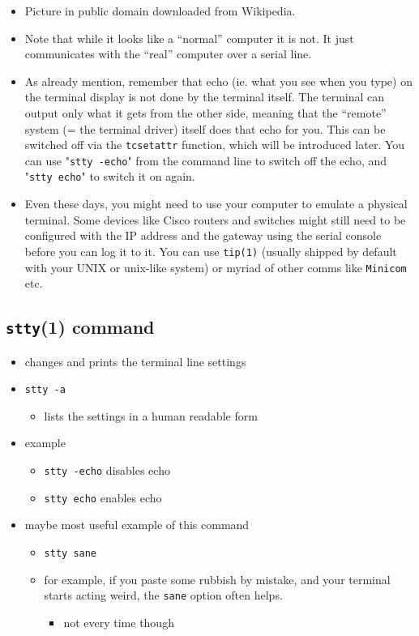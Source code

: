 \begin{itemize}
\item Picture in public domain downloaded from Wikipedia.
\item Note that while it looks like a ``normal'' computer it is not. It just
communicates with the ``real'' computer over a serial line.
\item As already mention, remember that echo (ie. what you see when you type) on
the terminal display is not done by the terminal itself. The terminal can output
only what it gets from the other side, meaning that the ``remote'' system (= the
terminal driver) itself does that echo for you. This can be switched off via the
\texttt{tcsetattr} function, which will be introduced later. You can use
"\texttt{stty -echo}" from the command line to switch off the echo, and
"\texttt{stty echo}" to switch it on again.
\item Even these days, you might need to use your computer to emulate a physical
terminal. Some devices like Cisco routers and switches might still need to be
configured with the IP address and the gateway using the serial console before
you can log it to it. You can use \texttt{tip(1)} (usually shipped by default
with your UNIX or un{}ix-like system) or myriad of other comms like
\texttt{Minicom} etc.
\end{itemize}

\subsection{\texttt{stty}(1) command}

\begin{itemize}
\item changes and prints the terminal line settings
\item \texttt{stty -a}
	\begin{itemize}
	\item lists the settings in a human readable form
	\end{itemize}
\item example
	\begin{itemize}
	\item \texttt{stty -echo} disables echo
	\item \texttt{stty echo} enables echo
	\end{itemize}
\item maybe most useful example of this command
	\begin{itemize}
	\item \texttt{stty sane}
	\item for example, if you paste some rubbish by mistake, and your
	terminal starts acting weird, the \texttt{sane} option often helps.
		\begin{itemize}
	  	\item not every time though
		\end{itemize}
	\end{itemize}
\end{itemize}

